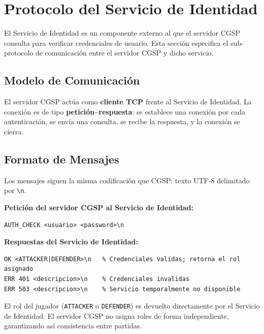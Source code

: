 \documentclass[12pt, letterpaper]{article}
\begin{document}
\section{Protocolo del Servicio de Identidad}

\label{sec:identity}

El Servicio de Identidad es un componente externo al que el servidor CGSP consulta para
verificar credenciales de usuario. Esta sección especifica el sub-protocolo de
comunicación entre el servidor CGSP y dicho servicio.

\subsection{Modelo de Comunicación}

El servidor CGSP actúa como \textbf{cliente TCP} frente al Servicio de Identidad.
La conexión es de tipo \textbf{petición--respuesta}: se establece una conexión por
cada autenticación, se envía una consulta, se recibe la respuesta, y la conexión
se cierra.

\subsection{Formato de Mensajes}

Los mensajes siguen la misma codificación que CGSP: texto UTF-8 delimitado por
\texttt{\textbackslash{}n}.

\textbf{Petición del servidor CGSP al Servicio de Identidad:}
\begin{lstlisting}
AUTH_CHECK <usuario> <password>\n
\end{lstlisting}

\textbf{Respuestas del Servicio de Identidad:}
\begin{lstlisting}
OK <ATTACKER|DEFENDER>\n   % Credenciales validas; retorna el rol asignado
ERR 401 <descripcion>\n    % Credenciales invalidas
ERR 503 <descripcion>\n    % Servicio temporalmente no disponible
\end{lstlisting}

\begin{nota}
El rol del jugador (\texttt{ATTACKER} o \texttt{DEFENDER}) es devuelto directamente
por el Servicio de Identidad. El servidor CGSP no asigna roles de forma independiente,
garantizando así consistencia entre partidas.
\end{nota}
\end{document}

